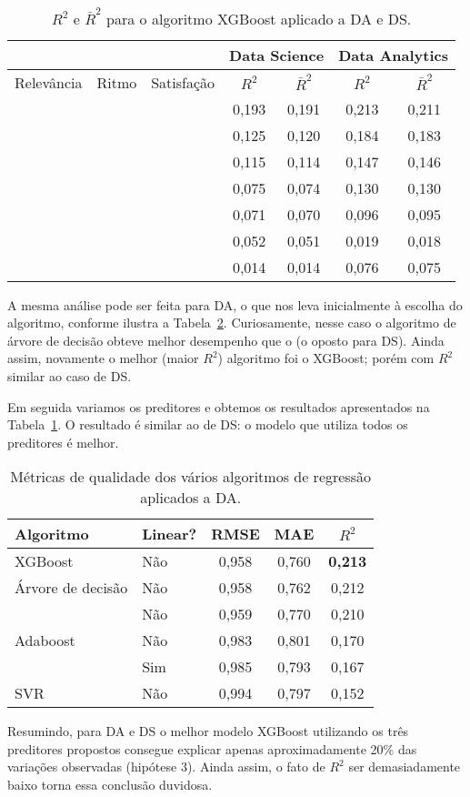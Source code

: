 \begin{table}
	\centering
	\caption{$R^2$ e $\bar R^2$ para o algoritmo XGBoost aplicado a DA e DS.}
	\label{tab:r2-adjusted}
	\begin{tabular}{ccccccc}
		\toprule
		           &            &            & \multicolumn{2}{c}{ Data Science  } & \multicolumn{2}{c}{ Data Analytics }\\
		\midrule
		Relevância & Ritmo      & Satisfação & $R^2$     & $\bar R^2$ & $R^2$     & $\bar R^2$\\
		\midrule
		\checkmark & \checkmark & \checkmark & 0,193 & 0,191 & 0,213 & 0,211 \\
		           & \checkmark & \checkmark & 0,125 & 0,120 & 0,184 & 0,183 \\
		\checkmark &            & \checkmark & 0,115 & 0,114 & 0,147 & 0,146 \\
		           &            & \checkmark & 0,075 & 0,074 & 0,130 & 0,130 \\
		\checkmark & \checkmark &            & 0,071 & 0,070 & 0,096 & 0,095 \\
		\checkmark &            &            & 0,052 & 0,051 & 0,019 & 0,018 \\
		           & \checkmark &            & 0,014 & 0,014 & 0,076 & 0,075 \\
		\bottomrule
	\end{tabular}
\end{table}

A mesma análise pode ser feita para DA, o que nos leva inicialmente à escolha do algoritmo, conforme ilustra a Tabela~\ref{tab:reg-da-1}.
Curiosamente, nesse caso o algoritmo de árvore de decisão obteve melhor desempenho que o  (o oposto para DS).
Ainda assim, novamente o melhor (maior $R^2$) algoritmo foi o XGBoost; porém com $R^2$ similar ao caso de DS.

Em seguida variamos os preditores e obtemos os resultados apresentados na Tabela~\ref{tab:r2-adjusted}.
O resultado é similar ao de DS: o modelo que utiliza todos os preditores é melhor.

\begin{table}
	\centering
	\caption{Métricas de qualidade dos vários algoritmos de regressão aplicados a DA.}
	\label{tab:reg-da-1}
	\begin{tabular}{llccc}
		\toprule
		Algoritmo               & Linear? & RMSE  &   MAE & $R^2$\\
		\midrule
		XGBoost                 & Não     & 0,958 & 0,760 & \textbf{0,213}\\
		Árvore de decisão       & Não     & 0,958 & 0,762 & 0,212\\
		\foreign{Random Forest} & Não     & 0,959 & 0,770 & 0,210\\
		Adaboost                & Não     & 0,983 & 0,801 & 0,170\\
		\foreign{ElasticNet}    & Sim     & 0,985 & 0,793 & 0,167\\
		SVR                     & Não     & 0,994 & 0,797 & 0,152\\
		\bottomrule
	\end{tabular}
\end{table}

Resumindo, para DA e DS o melhor modelo XGBoost utilizando os três preditores propostos consegue explicar apenas aproximadamente 20\% das variações observadas (hipótese 3).
Ainda assim, o fato de $R^2$ ser demasiadamente baixo torna essa conclusão duvidosa.
